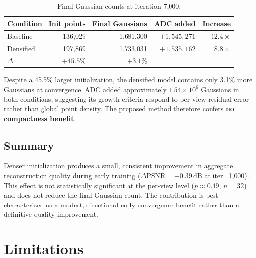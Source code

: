 \documentclass[12pt, a4paper]{article}
\begin{document}
\begin{table}[h]
\centering
\caption{Final Gaussian counts at iteration 7{,}000.}
\label{tab:compactness}
\begin{tabular}{lrrrr}
\toprule
\textbf{Condition} & \textbf{Init points} & \textbf{Final Gaussians}
                   & \textbf{ADC added} & \textbf{Increase} \\
\midrule
Baseline  & 136{,}029 & 1{,}681{,}300 & $+1{,}545{,}271$ & $12.4\times$ \\
Densified & 197{,}869 & 1{,}733{,}031 & $+1{,}535{,}162$ & $\phantom{1}8.8\times$ \\
\midrule
$\Delta$ & $+45.5\%$ & $+3.1\%$ & & \\
\bottomrule
\end{tabular}
\end{table}

Despite a 45.5\% larger initialization, the densified model contains only 3.1\%
more Gaussians at convergence. ADC added approximately $1.54\times10^6$ Gaussians
in both conditions, suggesting its growth criteria respond to per-view residual
error rather than global point density. The proposed method therefore confers
\textbf{no compactness benefit}.

\subsection{Summary}
\label{sec:summary}

\begin{tcolorbox}[notebox]
Denser initialization produces a small, consistent improvement in aggregate
reconstruction quality during early training ($\Delta\text{PSNR} = +0.39\,\text{dB}$
at iter.\ 1{,}000). This effect is not statistically significant at the per-view
level ($p \approx 0.49$, $n = 32$) and does not reduce the final Gaussian count.
The contribution is best characterized as a modest, directional early-convergence
benefit rather than a definitive quality improvement.
\end{tcolorbox}

\section{Limitations}
\end{document}

